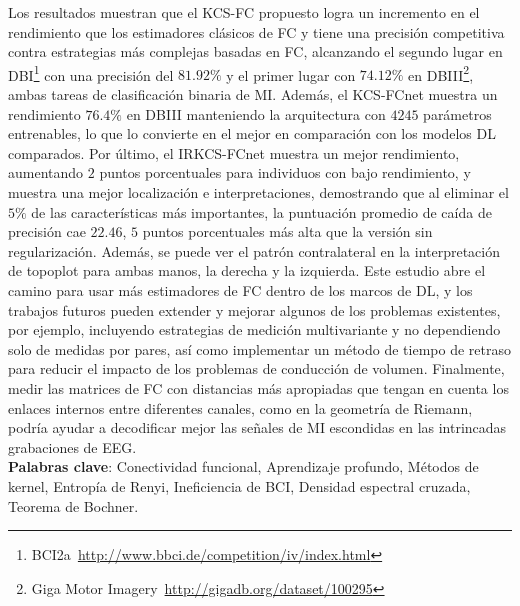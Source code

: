 Los resultados muestran que el KCS-FC propuesto logra un incremento en el rendimiento que los estimadores clásicos de FC y tiene una precisión competitiva contra estrategias más complejas basadas en FC, alcanzando el segundo lugar en DBI\footnote{BCI2a~\url{http://www.bbci.de/competition/iv/index.html}} con una precisión del $81.92\%$ y el primer lugar con $74.12\%$ en DBIII\footnote{Giga Motor Imagery~\url{http://gigadb.org/dataset/100295}}, ambas tareas de clasificación binaria de MI. Además, el KCS-FCnet muestra un rendimiento $76.4\%$ en DBIII manteniendo la arquitectura con $4245$ parámetros entrenables, lo que lo convierte en el mejor en comparación con los modelos DL comparados. Por último, el IRKCS-FCnet muestra un mejor rendimiento, aumentando $2$ puntos porcentuales para individuos con bajo rendimiento, y muestra una mejor localización e interpretaciones, demostrando que al eliminar el $5\%$ de las características más importantes, la puntuación promedio de caída de precisión cae $22.46$, $5$ puntos porcentuales más alta que la versión sin regularización. Además, se puede ver el patrón contralateral en la interpretación de topoplot para ambas manos, la derecha y la izquierda. Este estudio abre el camino para usar más estimadores de FC dentro de los marcos de DL, y los trabajos futuros pueden extender y mejorar algunos de los problemas existentes, por ejemplo, incluyendo estrategias de medición multivariante y no dependiendo solo de medidas por pares, así como implementar un método de tiempo de retraso para reducir el impacto de los problemas de conducción de volumen. Finalmente, medir las matrices de FC con distancias más apropiadas que tengan en cuenta los enlaces internos entre diferentes canales, como en la geometría de Riemann, podría ayudar a decodificar mejor las señales de MI escondidas en las intrincadas grabaciones de EEG.
\\[2cm]
\textbf{Palabras clave}: Conectividad funcional, Aprendizaje profundo, Métodos de kernel, Entropía de Renyi, Ineficiencia de BCI, Densidad espectral cruzada, Teorema de Bochner.

\newpage 
